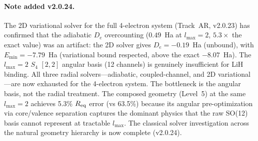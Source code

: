 \documentclass[aps,pra,twocolumn,superscriptaddress,longbibliography]{revtex4-2}
\begin{document}
\paragraph{Note added v2.0.24.}
The 2D variational solver for the full 4-electron system (Track~AR,
v2.0.23) has confirmed that the adiabatic $D_e$ overcounting
($0.49$~Ha at $l_{\max} = 2$, $5.3{\times}$ the exact value) was an
artifact: the 2D solver gives $D_e = -0.19$~Ha (unbound), with
$E_{\min} = -7.79$~Ha (variational bound respected, above the exact
$-8.07$~Ha).  The $l_{\max} = 2$ $S_4$ $[2,2]$ angular basis (12
channels) is genuinely insufficient for LiH binding.  All three
radial solvers---adiabatic, coupled-channel, and 2D
variational---are now exhausted for the 4-electron system.  The
bottleneck is the angular basis, not the radial treatment.  The
composed geometry (Level~5) at the same $l_{\max} = 2$ achieves
5.3\% $R_{\rm eq}$ error (vs 63.5\%) because its angular
pre-optimization via core/valence separation captures the dominant
physics that the raw SO(12) basis cannot represent at tractable
$l_{\max}$.  The classical solver investigation across the natural
geometry hierarchy is now complete (v2.0.24).
\end{document}
